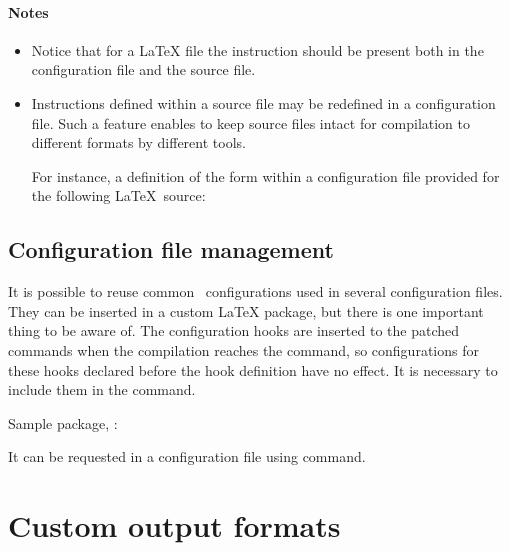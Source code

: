 \paragraph{Notes}

\begin{itemize}
  \item Notice that for a LaTeX file the \texcommand{}
    instruction should be present both in the configuration file and the source
    file.

  \item Instructions defined within a source file may be redefined in a
    configuration file. Such a feature enables to keep source files intact for
    compilation to different formats by different tools.

    For instance, a definition of the form  within a
    configuration file provided for the following \LaTeX\ source:
\end{itemize}



\subsection{Configuration file management}

It is possible to reuse common \texfourht\ configurations used in several
configuration files.  They can be inserted in a custom LaTeX package, but there
is one important thing to be aware of. The configuration hooks are inserted to
the patched commands when the compilation reaches the  
\texcommand{} command, so configurations for these hooks
declared before the hook definition have no effect. It is necessary to include
them in the \texcommand{\AtBeginDocument} command.

Sample package, :


It can be requested in a configuration file using \texcommand{\RequirePackage} command.

\begin{texsource}
\RequirePackage{commonconfigurations}

\EndPreamble
\end{texsource}

\section{Custom output formats}

